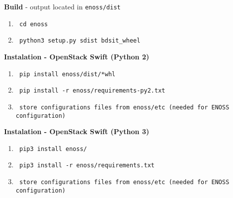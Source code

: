 \textbf{Build} - output located in \texttt{enoss/dist}
\begin{enumerate}
    \item \begin{verbatim} cd enoss\end{verbatim}
    \item \begin{verbatim} python3 setup.py sdist bdsit_wheel\end{verbatim}
\end{enumerate}

\textbf{Instalation - OpenStack Swift (Python 2)}
\begin{enumerate}
    \item \begin{verbatim} pip install enoss/dist/*whl\end{verbatim}
    \item \begin{verbatim} pip install -r enoss/requirements-py2.txt\end{verbatim}
    \item \begin{verbatim} store configurations files from enoss/etc (needed for ENOSS configuration)\end{verbatim}
\end{enumerate}

\textbf{Instalation - OpenStack Swift (Python 3)}
\begin{enumerate}
    \item \begin{verbatim} pip3 install enoss/\end{verbatim}
    \item \begin{verbatim} pip3 install -r enoss/requirements.txt\end{verbatim}
    \item \begin{verbatim} store configurations files from enoss/etc (needed for ENOSS configuration)\end{verbatim}
\end{enumerate}

